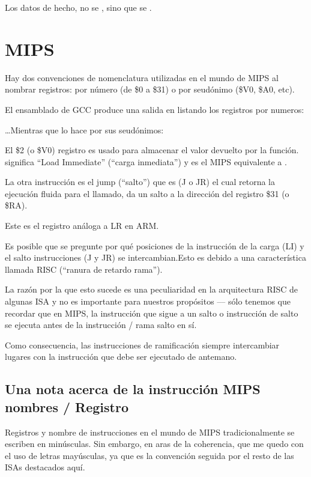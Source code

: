Los datos de hecho, no se , sino que se .

\ifdefined\IncludeMIPS
\section{MIPS}

\label{MIPS_leaf_function_ex1}
Hay dos convenciones de nomenclatura utilizadas en el mundo de MIPS al nombrar registros: por número (de \$0 a \$31) o por seudónimo (\$V0, \$A0, etc).

El ensamblado de GCC produce una salida en listando los registros por numeros:



\dots Mientras que \IDA lo hace por sus seudónimos:



El \$2 (o \$V0) registro es usado para almacenar el valor devuelto por la función.
 significa ``Load Immediate'' (``carga inmediata'') y es el MIPS equivalente a \MOV.

La otra instrucción es el jump (``salto'') que es  (J o JR) el cual retorna la ejecución fluida para el llamado, da un salto a la dirección del registro \$31 (o \$RA).

Este es el registro análoga a \ac{LR} en ARM.

Es posible que se pregunte por qué posiciones de la instrucción de la carga (LI) y el salto instrucciones (J y JR) se intercambian.Esto es debido a una característica llamada RISC (``ranura de retardo rama'').

La razón por la que esto sucede es una peculiaridad en la arquitectura RISC de algunas ISA y no es importante para nuestros propósitos --– sólo tenemos que recordar que en MIPS, la instrucción que sigue a un salto o instrucción de salto se ejecuta antes de la instrucción / rama salto en sí.

Como consecuencia, las instrucciones de ramificación siempre intercambiar lugares con la instrucción que debe ser ejecutado de antemano.

\subsection{Una nota acerca de la instrucción MIPS nombres / Registro}

Registros y nombre de instrucciones en el mundo de MIPS tradicionalmente se escriben en minúsculas.
Sin embargo, en aras de la  coherencia, que me quedo con el uso de letras mayúsculas, ya que es la convención seguida por el resto de las ISAs destacados aquí.

\fi %


